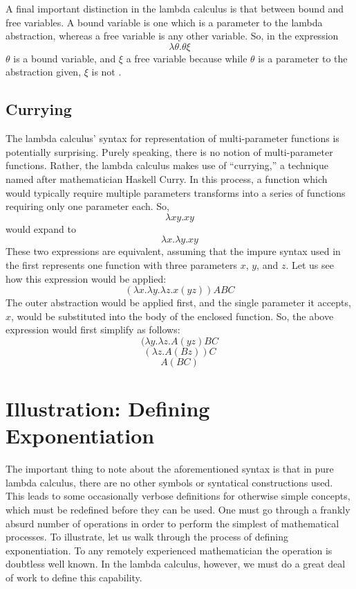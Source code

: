 \documentclass[twocolumn,titlepage,12pt]{article}
\begin{document}
A final important distinction in the lambda calculus is that between bound and free variables. A bound variable is one which is a parameter to the lambda abstraction, whereas a free variable is any other variable. So, in the expression
$$\lambda \theta.\theta \xi$$
$\theta$ is a bound variable, and $\xi$ a free variable because while $\theta$ is a parameter to the abstraction given, $\xi$ is not \cite{stanfordlc}.

\subsection{Currying}
The lambda calculus' syntax for representation of multi-parameter functions is potentially surprising. Purely speaking, there is no notion of multi-parameter functions. Rather, the lambda calculus makes use of ``currying,'' a technique named after mathematician Haskell Curry. In this process, a function which would typically require multiple parameters transforms into a series of functions requiring only one parameter each. So,
$$\lambda xy.xy$$
would expand to
$$\lambda x.\lambda y.xy$$
These two expressions are equivalent, assuming that the impure syntax used in the first represents one function with three parameters $x$, $y$, and $z$. Let us see how this expression would be applied:
$$(\lambda x.\lambda y.\lambda z.x(yz))ABC$$
The outer abstraction would be applied first, and the single parameter it accepts, $x$, would be substituted into the body of the enclosed function. So, the above expression would first simplify as follows:
$$(\lambda y.\lambda z.A(yz)BC$$
$$(\lambda z.A(Bz))C$$
$$A(BC)$$

\section{Illustration: Defining Exponentiation}
The important thing to note about the aforementioned syntax is that in pure lambda calculus, there are no other symbols or syntatical constructions used. This leads to some occasionally verbose definitions for otherwise simple concepts, which must be redefined before they can be used. One must go through a frankly absurd number of operations in order to perform the simplest of mathematical processes. To illustrate, let us walk through the process of defining exponentiation. To any remotely experienced mathematician the operation is doubtless well known. In the lambda calculus, however, we must do a great deal of work to define this capability.
\end{document}
